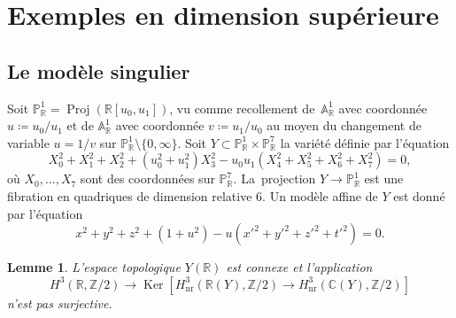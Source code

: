 \documentclass[JEP,XML,SOM,Unicode,francais,published]{cedram}
\newtheorem{lemma}[thm]{Lemme}
\theoremstyle{definition}
\newcommand{\C}{\mathbb C}
\newcommand{\Z}{\mathbb Z}
\newcommand{\R}{\mathbb R}
\newcommand{\A}{\mathbb A}
\renewcommand{\P}{\mathbb P}
\newcommand{\on}[1]{\operatorname{#1}}
\begin{document}
\section{Exemples en dimension supérieure}\label{dimsup}

\subsection{Le modèle singulier} Soit $\P^1_\R=\on{Proj}(\R[u_0,u_1])$, vu comme recollement de~$\A^1_\R$ avec coordonnée $u\coloneqq u_0/u_1$ et de $\A^1_\R$ avec coordonnée $v\coloneqq u_1/u_0$ au moyen du changement de variable $u=1/v$ sur $\P^1_\R\setminus\{0,\infty\}$. Soit $Y\subset \P^1_\R\times \P^7_\R$ la variété définie par l'équation
\[X_0^2+X_1^2+X_2^2 + (u_0^2+u_1^2)X_3^2 - u_0u_1(X_4^2+X_5^2+X_6^2+X_7^2) =0,\]
où $X_0,\dots,X_7$ sont des coordonnées sur $\P^7_\R$. La~projection $Y\to \P^1_\R$ est une fibration en quadriques de dimension relative $6$. Un modèle affine de $Y$ est donné par l'équation
\begin{equation} \label{eq:affine}
x^2+y^2+z^2 + (1+u^2) - u(x'^2+y'^2+z'^2+t'^2) = 0.
\end{equation}

\begin{lemma}\label{deuxieme-modele}
L'espace topologique $Y(\R)$ est connexe et l'application
\[H^3(\R,\Z/2)\to \on{Ker}[H^3_{\on{nr}}(\R(Y),\Z/2)\to H^3_{\on{nr}}(\C(Y),\Z/2)]\] n'est pas surjective.
\end{lemma}
\end{document}
